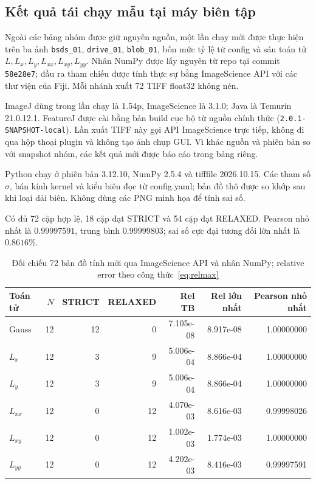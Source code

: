 \subsection{Kết quả tái chạy mẫu tại máy biên tập}
Ngoài các bảng nhóm được giữ nguyên nguồn, một lần chạy mới được thực hiện trên ba ảnh
\texttt{bsds\_01}, \texttt{drive\_01}, \texttt{blob\_01}, bốn mức tỷ lệ từ config
và sáu toán tử $L,L_x,L_y,L_{xx},L_{xy},L_{yy}$. Nhân NumPy được lấy nguyên từ
repo tại commit \texttt{58e28e7}; đầu ra tham chiếu được tính thực sự bằng
ImageScience API với các thư viện của Fiji. Mỗi nhánh xuất 72 TIFF float32 không nén.

ImageJ dùng trong lần chạy là 1.54p, ImageScience là 3.1.0; Java là Temurin
21.0.12.1. FeatureJ được cài bằng bản build cục bộ từ nguồn chính thức
(\texttt{2.0.1-SNAPSHOT-local}). Lần xuất TIFF này gọi API ImageScience trực tiếp,
không đi qua hộp thoại plugin và không tạo ảnh chụp GUI. Vì khác nguồn và phiên bản
so với snapshot nhóm, các kết quả mới được báo cáo trong bảng riêng.

Python chạy ở phiên bản 3.12.10, NumPy 2.5.4
và tifffile 2026.10.15. Các tham số $\sigma$, bán kính kernel và
kiểu biên đọc từ config.yaml; bản đồ thô được so khớp sau khi loại dải biên.
Không dùng các PNG minh họa để tính sai số.

Có đủ 72 cặp hợp lệ, 18 cặp đạt STRICT và 54 cặp đạt RELAXED. Pearson nhỏ nhất là $0.99997591$, trung bình $0.99999803$; sai số cực đại tương đối lớn nhất là $0.8616\%$.

\begin{table}[t]
\centering
\caption{Đối chiếu 72 bản đồ tính mới qua ImageScience API và nhân NumPy; relative error theo công thức~\eqref{eq:relmax}}
\begin{tabular}{lrrrrrr}
\toprule
Toán tử & $N$ & STRICT & RELAXED & Rel TB & Rel lớn nhất & Pearson nhỏ nhất\\
\midrule
Gauss & 12 & 12 & 0 & 7.105e-08 & 8.917e-08 & 1.00000000 \\
$L_x$ & 12 & 3 & 9 & 5.006e-04 & 8.866e-04 & 1.00000000 \\
$L_y$ & 12 & 3 & 9 & 5.006e-04 & 8.866e-04 & 1.00000000 \\
$L_{xx}$ & 12 & 0 & 12 & 4.070e-03 & 8.616e-03 & 0.99998026 \\
$L_{xy}$ & 12 & 0 & 12 & 1.002e-03 & 1.774e-03 & 1.00000000 \\
$L_{yy}$ & 12 & 0 & 12 & 4.202e-03 & 8.416e-03 & 0.99997591 \\
\bottomrule
\end{tabular}
\label{tab:local_sample}
\end{table}

